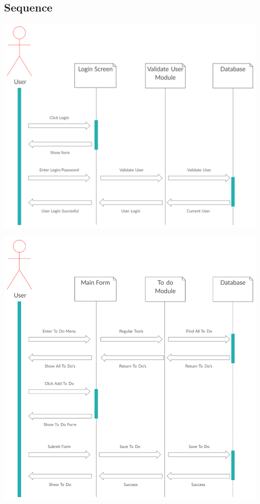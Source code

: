 \subsection{Sequence}
\par
\includegraphics[width=\textwidth]{secuence digrram1}
\par
\includegraphics[width=\textwidth]{secuence digrram2}
